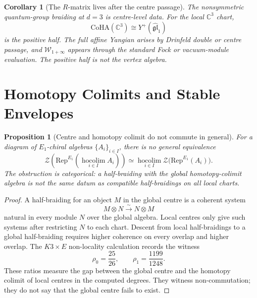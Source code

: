 \documentclass[11pt]{amsart}
\newtheorem{prop}[thm]{Proposition}
\newtheorem{cor}[thm]{Corollary}
\theoremstyle{definition}
\newcommand{\cZ}{\mathcal Z}
\newcommand{\Rep}{\mathrm{Rep}}
\newcommand{\C}{\mathbb C}
\newcommand{\CoHA}{\mathrm{CoHA}}
\begin{document}
\begin{cor}[The \(R\)-matrix lives after the centre passage]
\label{cor:rmatrix-after-centre}
The nonsymmetric quantum-group braiding at $d=3$ is centre-level data.
For the local $\C^3$ chart,
\[
  \CoHA(\C^3)\cong Y^+(\widehat{\mathfrak{gl}}_1)
\]
is the positive half.  The full affine Yangian arises by Drinfeld
double or centre passage, and $\mathcal W_{1+\infty}$ appears through
the standard Fock or vacuum-module evaluation.  The positive half is
not the vertex algebra.
\end{cor}

\section{Homotopy Colimits and Stable Envelopes}
\label{sec:hocolim-stable-envelopes}

\begin{prop}[Centre and homotopy colimit do not commute in general]
\label{prop:centre-hocolim-gap}
For a diagram of $E_1$-chiral algebras $\{A_i\}_{i\in I}$, there is no
general equivalence
\[
  \cZ\!\left(\Rep^{E_1}\!\left(\operatorname*{hocolim}_{i\in I} A_i\right)\right)
  \simeq
  \operatorname*{hocolim}_{i\in I}
  \cZ\bigl(\Rep^{E_1}(A_i)\bigr).
\]
The obstruction is categorical: a half-braiding with the global
homotopy-colimit algebra is not the same datum as compatible
half-braidings on all local charts.
\end{prop}

\begin{proof}
A half-braiding for an object $M$ in the global centre is a coherent
system
\[
  M\otimes N \xrightarrow{\sim} N\otimes M
\]
natural in every module $N$ over the global algebra.  Local centres only
give such systems after restricting $N$ to each chart.  Descent from
local half-braidings to a global half-braiding requires higher coherence
on every overlap and higher overlap.  The $K3\times E$ non-locality
calculation records the witness
\[
  \rho_0=\frac{25}{26},\qquad
  \rho_1=\frac{1199}{1248}.
\]
These ratios measure the gap between the global centre and the homotopy
colimit of local centres in the computed degrees.  They witness
non-commutation; they do not say that the global centre fails to exist.
\end{proof}
\end{document}
